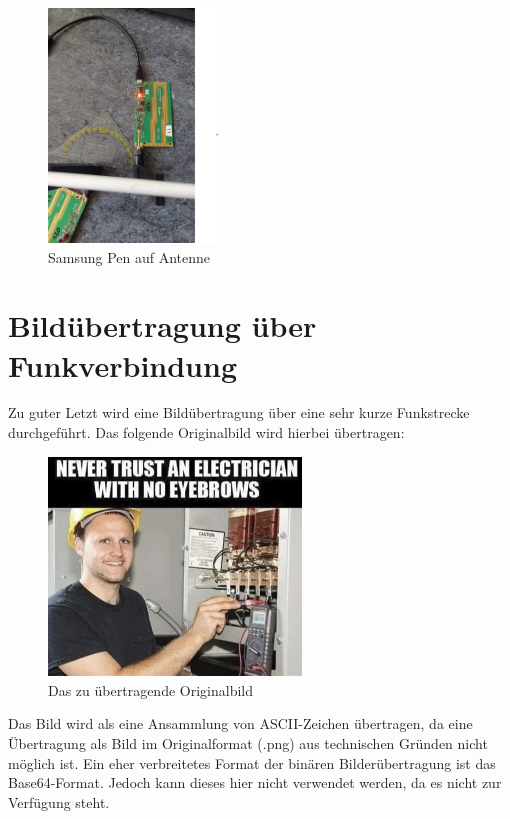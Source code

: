 \begin{figure}[H]
    \centering
    \includegraphics[width=0.4\textwidth]{Pictures/stift.png}
    \caption{Samsung Pen auf Antenne}
\end{figure}



\section{Bildübertragung über Funkverbindung}
Zu guter Letzt wird eine Bildübertragung über eine sehr kurze Funkstrecke durchgeführt. Das folgende Originalbild wird hierbei übertragen:
\begin{figure}[H]
    \centering
    \includegraphics[width=0.6\textwidth]{Pictures/meme.jpg}
    \caption{Das zu übertragende Originalbild}
    \label{fig:Task2b}
\end{figure}

Das Bild wird als eine Ansammlung von ASCII-Zeichen übertragen, da eine Übertragung als Bild im Originalformat (.png) aus technischen Gründen nicht möglich ist.
Ein eher verbreitetes Format der binären Bilderübertragung ist das Base64-Format. Jedoch kann dieses hier nicht verwendet werden, da es nicht zur Verfügung steht.

